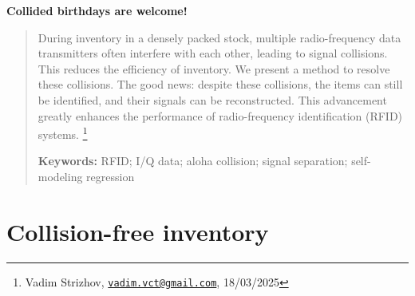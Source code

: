 \documentclass[12pt]{article}
\begin{document}
\begin{center}
{\Huge\bf Collided birthdays are welcome!} %
\end{center}

\begin{quote}
During inventory in a densely packed stock, multiple radio-frequency data transmitters often interfere with each other, leading to signal collisions. This reduces the efficiency of inventory. We present a method to resolve these collisions. The good news: despite these collisions, the items can still be identified, and their signals can be reconstructed. This advancement greatly enhances the performance of radio-frequency identification (RFID) systems.
\footnote{Vadim Strizhov, \href{mailto:vadim.vct@gmail.com}{\texttt{vadim.vct@gmail.com}}, 18/03/2025}

\bigskip
\noindent \textbf{Keywords:} RFID; I/Q data;  aloha collision; signal separation; self-modeling regression
\bigskip
\end{quote}

\section{Collision-free inventory}
\end{document}
